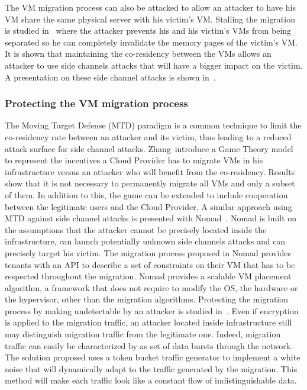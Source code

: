 The VM migration process can also be attacked to allow an attacker to have his VM share the same physical server with his victim's VM. Stalling the migration is studied in~\cite{stalling-atya2017} where the attacker prevents his and his victim's VMs from being separated so he can completely invalidate the memory pages of the victim's VM. It is shown that maintaining the co-residency between the VMs allows an attacker to use side channels attacks that will have a bigger impact on the victim.
A presentation on these side channel attacks is shown in~\cite{malicious-atya2017}.

\subsubsection{Protecting the VM migration process}
The Moving Target Defense (MTD) paradigm is a common technique to limit the co-residency rate between an attacker and its victim, thus leading to a reduced attack surface for side channel attacks.
Zhang~\etal introduce a Game Theory model~\cite{incentivemtd-Zhang2012} to represent the incentives a Cloud Provider has to migrate VMs in his infrastructure versus an attacker who will benefit from the co-residency. Results show that it is not necessary to permanently migrate all VMs and only a subset of them. In addition to this, the game can be extended to include cooperation between the legitimate users and the Cloud Provider.
A similar approach using MTD against side channel attacks is presented with Nomad~\cite{nomad-Moon2015b}. Nomad is built on the assumptions that the attacker cannot be precisely located inside the infrastructure, can launch potentially unknown side channels attacks and can precisely target his victim. 
The migration process proposed in Nomad provides tenants with an API to describe a set of constraints on their VM that has to be respected throughout the migration.
Nomad provides a scalable VM placement algorithm, a framework that does not require to modify the OS, the hardware or the hypervisor, other than the migration algorithms.
Protecting the migration process by making undetectable by an attacker is studied in~\cite{stealth-Achleitner2017a}. Even if encryption is applied to the migration traffic, an attacker located inside infrastructure still may distinguish migration traffic from the legitimate one. Indeed, migration traffic can easily be characterized by as set of data bursts through the network. The solution proposed uses a token bucket traffic generator to implement a white noise that will dynamically adapt to the traffic generated by the migration. This method will make each traffic look like a constant flow of indistinguishable data.

